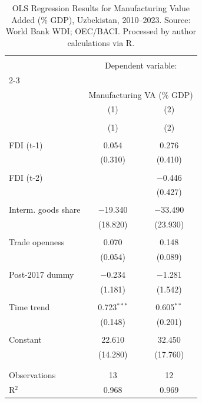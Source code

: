 
\begin{table}[!htbp] \centering 
  \caption{OLS Regression Results for Manufacturing Value Added (\% GDP), Uzbekistan, 2010--2023. Source: World Bank WDI; OEC/BACI. Processed by author calculations via R.} 
  \label{tab:ols_mfg} 
\begin{tabular}{@{\extracolsep{5pt}}lcc} 
\\[-1.8ex]\hline 
\hline \\[-1.8ex] 
 & \multicolumn{2}{c}{Dependent variable:} \\ 
\cline{2-3} 
\\[-1.8ex] & \multicolumn{2}{c}{Manufacturing VA (\% GDP)} \\ 
 & (1) & (2) \\ 
\\[-1.8ex] & (1) & (2)\\ 
\hline \\[-1.8ex] 
 FDI (t-1) & 0.054 & 0.276 \\ 
  & (0.310) & (0.410) \\ 
  & & \\ 
 FDI (t-2) &  & $-$0.446 \\ 
  &  & (0.427) \\ 
  & & \\ 
 Interm. goods share & $-$19.340 & $-$33.490 \\ 
  & (18.820) & (23.930) \\ 
  & & \\ 
 Trade openness & 0.070 & 0.148 \\ 
  & (0.054) & (0.089) \\ 
  & & \\ 
 Post-2017 dummy & $-$0.234 & $-$1.281 \\ 
  & (1.181) & (1.542) \\ 
  & & \\ 
 Time trend & 0.723$^{***}$ & 0.605$^{**}$ \\ 
  & (0.148) & (0.201) \\ 
  & & \\ 
 Constant & 22.610 & 32.450 \\ 
  & (14.280) & (17.760) \\ 
  & & \\ 
\hline \\[-1.8ex] 
Observations & 13 & 12 \\ 
R$^{2}$ & 0.968 & 0.969 \\ 

\end{tabular}
\end{table}
